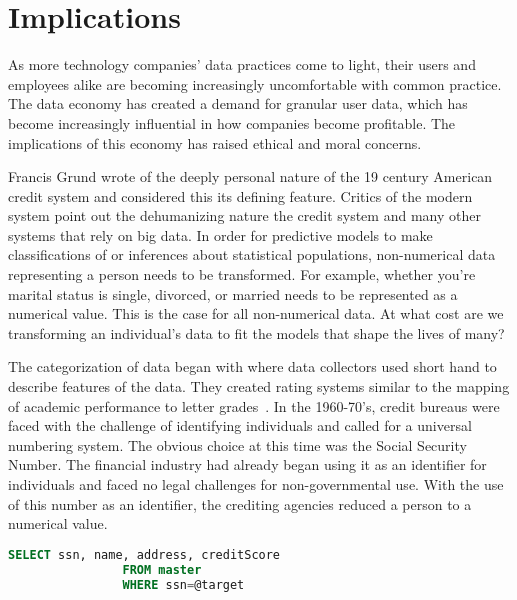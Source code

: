 \section{Implications}
As more technology companies' data practices come to light, their users and
employees alike are becoming increasingly uncomfortable with common practice.
The data economy has created a demand for granular user data, which has become
increasingly influential in how companies become profitable. The implications
of this economy has raised ethical and moral concerns.

Francis Grund wrote of the deeply personal nature of the 19 century
American credit system and considered this its defining feature. Critics of the
modern system point out the dehumanizing nature the credit system and many
other systems that rely on big data. In order for predictive models to make
classifications of or inferences about statistical populations, non-numerical
data representing a person needs to be transformed. For example, whether you're
marital status is single, divorced, or married needs to be represented as a
numerical value. This is the case for all non-numerical data. At what cost are
we transforming an individual's data to fit the models that shape the lives of
many? %

The categorization of data began with \mca where data collectors used
short hand to describe features of the data. They created rating systems
similar to the mapping of academic performance to letter
grades~\cite{lauer2017creditworthy}. In the 1960-70's, credit bureaus were
faced with the challenge of identifying individuals and called for a universal
numbering system. The obvious choice at this time was the Social Security
Number. The financial industry had already began using it as an identifier for
individuals and faced no legal challenges for non-governmental use. With the
use of this number as an identifier, the crediting agencies reduced a person to
a numerical value.

\begin{lstlisting}[language=SQL, basicstyle=\sffamily]
		SELECT ssn, name, address, creditScore
				FROM master
				WHERE ssn=@target
\end{lstlisting}

